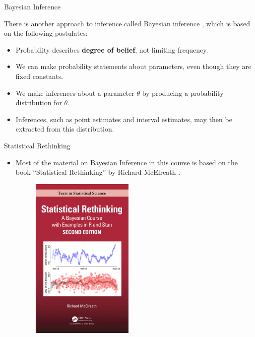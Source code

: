 \documentclass[handout]{beamer}
\begin{document}
\begin{frame}{Bayesian Inference}
\scriptsize{
There is another approach to inference called Bayesian inference \cite{wasserman2013all}, which is based on the following postulates:
\begin{itemize}
 \item Probability describes \textbf{degree of belief}, not limiting frequency. 
 
 
 \item We can make probability statements about parameters, even though they are fixed constants.
 \item We make inferences about a parameter $\theta$ by producing a probability distribution for $\theta$. 
 
 \item Inferences, such as point estimates and interval estimates, may then be extracted from this distribution.
\end{itemize}

} 
\end{frame}


\begin{frame}{Statistical Rethinking}
\scriptsize{
\begin{itemize}
 \item Most of the material on Bayesian Inference in this course is based on the book ``Statistical Rethinking'' by Richard McElreath \cite{mcelreath2020statistical}.
 
 \begin{figure}[h!]
	\centering
	\includegraphics[scale=0.5]{pics/rethinking.png}
\end{figure}
 
 
\end{itemize}
 } 
\end{frame}
\end{document}
